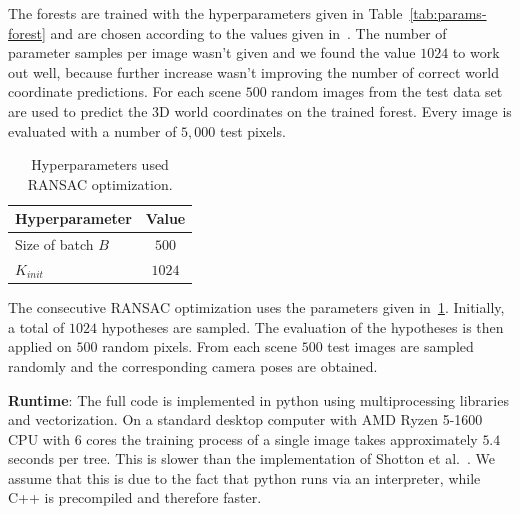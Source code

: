 \documentclass[final]{cvpr}
\begin{document}
The forests are trained with the hyperparameters given in Table~\ref{tab:params-forest} and are chosen according to the 
values given in~\cite{shotton2013}. The number of parameter samples per image wasn't given and we found the
value $1024$ to work out well, because further increase wasn't improving the number of correct world coordinate predictions.
For each scene $500$ random images from the test data set are used
to predict the 3D world coordinates on the trained forest. Every image is evaluated with a number of $5,000$ test pixels.

\begin{table}[h!]
	\begin{center}
	\begin{tabular}{|l|c|}
	\hline
	Hyperparameter & Value \\
	\hline\hline
	Size of batch $B$ & $500$ \\
	$K_{init}$ & $1024$ \\
	
	\hline
	\end{tabular}
	\end{center}
	\caption{Hyperparameters used RANSAC optimization.}
	\label{tab:params-ransac}
\end{table}

The consecutive RANSAC optimization uses the parameters given in~\ref{tab:params-ransac}. Initially, a total of $1024$
hypotheses are sampled. The evaluation of the hypotheses is then applied on $500$ random pixels. From each scene $500$
test images are sampled randomly and the corresponding camera poses are obtained.

\textbf{Runtime}: The full code is implemented in python using multiprocessing libraries and vectorization. On a standard
desktop computer with AMD Ryzen 5-1600 CPU with 6 cores the training process of a single image
takes approximately $5.4$ seconds per tree. This is slower than the implementation of Shotton et al.~\cite{shotton2013}.
We assume that this is due to the fact that python runs via an interpreter, while C++ is precompiled and therefore faster.
\end{document}
